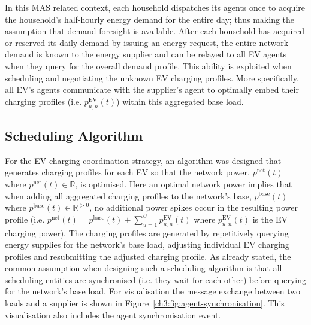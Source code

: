 In this MAS related context, each household dispatches its agents once to acquire the household's half-hourly energy demand for the entire day; thus making the assumption that demand foresight is available.
After each household has acquired or reserved its daily demand by issuing an energy request, the entire network demand is known to the energy supplier and can be relayed to all EV agents when they query for the overall demand profile.
This ability is exploited when scheduling and negotiating the unknown EV charging profiles.
More specifically, all EV's agents communicate with the supplier's agent to optimally embed their charging profiles (i.e. $p^\text{EV}_{u,n}(t)$) within this aggregated base load.

\subsection{Scheduling Algorithm}
\label{ch3:subsec:scheduling-algorithm}

For the EV charging coordination strategy, an algorithm was designed that generates charging profiles for each EV so that the network power, $p^\text{net}(t)$ where $p^\text{net}(t) \in \mathbb{R}$, is optimised.
Here an optimal network power implies that when adding all aggregated charging profiles to the network's base, $p^\text{base}(t)$  where $p^\text{base}(t) \in \mathbb{R}^{>0}$, no additional power spikes occur in the resulting power profile (i.e. $p^\text{net}(t) = p^\text{base}(t) + \sum_{u=1}^U p^\text{EV}_{u,n}(t)$ where $p^\text{EV}_{u,n}(t)$ is the EV charging power).
The charging profiles are generated by repetitively querying energy supplies for the network's base load, adjusting individual EV charging profiles and resubmitting the adjusted charging profile.
As already stated, the common assumption when designing such a scheduling algorithm is that all scheduling entities are synchronised (i.e. they wait for each other) before querying for the network's base load.
For visualisation the message exchange between two loads and a supplier is shown in Figure~\ref{ch3:fig:agent-synchronisation}.
This visualisation also includes the agent synchronisation event.

